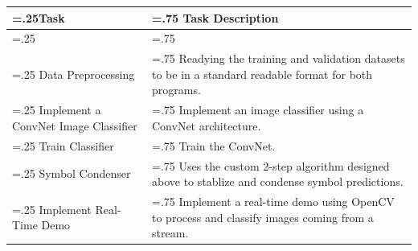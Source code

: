 \documentclass[11pt]{article}
\begin{document}
        \begin{center}
        \begin{tabularx}{1\textwidth}
            { 
            | >{\raggedright\arraybackslash\hsize=.25\hsize}X 
            | >{\raggedright\arraybackslash\hsize=.75\hsize}X | 
            }
            \hline
                \textbf{Task} & \textbf{Task Description} \\ [0.5ex] 
            \hline

            \hline
            \hline
                \multicolumn{2}{| l |}{\textit{ConvNet Approach}} \\ [0.2cm]
                \hline
                Data Preprocessing & Readying the training and validation datasets to be in a standard readable format for both programs. \\ [0.7cm]
                \hline
                Implement a ConvNet Image Classifier & Implement an image classifier using a ConvNet architecture. \\ [0.7cm]
                \hline
                Train Classifier & Train the ConvNet. \\ [0.7cm]
                \hline
                Symbol Condenser & Uses the custom 2-step algorithm designed above to stablize and condense symbol predictions. \\ [0.7cm]
                \hline
                Implement Real-Time Demo & Implement a real-time demo using OpenCV to process and classify images coming from a stream. \\ [0.7cm]
            \hline
            

\end{tabularx}
\end{center}
\end{document}
